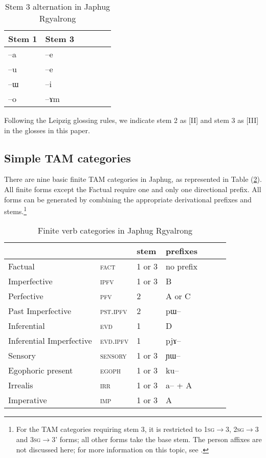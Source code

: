 \documentclass[oldfontcommands,oneside,a4paper,11pt]{article}
\newcommand{\ipa}[1]{{\phon \mbox{#1}}} %
\newcommand{\refb}[1]{(\ref{#1})}
\begin{document}
 \begin{table}[H]
\caption{Stem 3 alternation in Japhug Rgyalrong} \label{tab:stem3} \centering
\begin{tabular}{llllll}
\toprule
Stem 1 & Stem 3 \\
\midrule
\ipa{--a} & \ipa{--e} \\
\ipa{--u} & \ipa{--e} \\
\ipa{--ɯ} & \ipa{--i} \\
\ipa{--o} & \ipa{--ɤm} \\
\bottomrule
\end{tabular}
\end{table}

Following the Leipzig glossing rules, we indicate stem 2 as [II] and stem 3 as [III] in the glosses in this paper.

\subsection{Simple TAM categories} \label{sec:finite.TAM}
There are nine basic finite TAM categories in Japhug, as represented in Table \refb{tab:finite.forms}. All finite forms except the Factual require one and only one directional prefix. All forms can be generated  by combining the appropriate derivational prefixes and stems.\footnote{For the TAM categories requiring stem 3, it is restricted to  \textsc{1sg}$\rightarrow$3, \textsc{2sg}$\rightarrow$3 and \textsc{3sg}$\rightarrow$3' forms; all other forms take the base stem.  The person affixes  are not discussed here; for  more information on this topic, see \citet{jacques10inverse}.}

\begin{table}[H]
\caption{Finite verb categories in Japhug Rgyalrong} \label{tab:finite.forms} \centering
\begin{tabular}{lllllll}
\toprule
&	&	stem&	prefixes\\
\midrule
Factual&	\textsc{fact} &	1 or 3&	no prefix\\
Imperfective&	\textsc{ipfv} &	1 or 3&	B\\
Perfective&	\textsc{pfv} &	2&	A or C\\
Past Imperfective&	\textsc{pst.ipfv} &	2&	\ipa{pɯ--}\\
Inferential&	\textsc{evd} &	1&	D\\
Inferential Imperfective&	\textsc{evd.ipfv} &	1&	\ipa{pjɤ--}\\
Sensory&	\textsc{sensory} &	1 or 3&	\ipa{ɲɯ--}\\
Egophoric present&	\textsc{egoph} &	1 or 3&	\ipa{ku--}\\
Irrealis&	\textsc{irr} &	1 or 3&	\ipa{a--} + A\\
Imperative&	\textsc{imp} &	1 or 3&	A\\
\bottomrule
\end{tabular}
\end{table}
\end{document}
